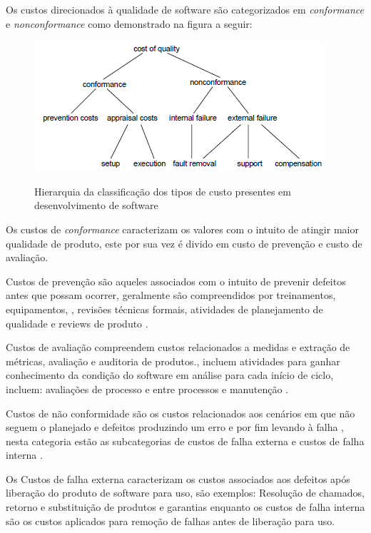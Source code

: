 \documentclass[
	12pt,				%
	oneside,			%
	a4paper,			%
	english,			%
	brazil				%
	]{abntex2ppgsi}
\begin{document}
Os custos direcionados à qualidade de software são categorizados em \textit{conformance} e \textit{nonconformance} \cite{ slaughter1998}\cite{pressman2009engenharia} como demonstrado na figura a seguir: 

\begin{figure}[H]%
	\centering
 	  \caption{Hierarquia da classificação dos tipos de custo presentes em desenvolvimento de software}
		\includegraphics{tipos-custo-arvore.png}
	\label{fig:tipos-custo-arvore}
\end{figure}

Os custos de \textit{conformance} caracterizam os valores com o intuito de atingir maior qualidade de produto, este por sua vez é divido em custo de prevenção e custo de avaliação. \cite{ wagner2005}

Custos de prevenção são aqueles associados com o intuito de prevenir defeitos antes que possam ocorrer, geralmente são compreendidos por treinamentos, equipamentos, , revisões técnicas formais, atividades de planejamento de qualidade e reviews de produto \cite{wagner2005} \cite{pressman2009engenharia}.

Custos de avaliação compreendem custos relacionados a medidas e extração de métricas, avaliação e auditoria de produtos.\cite{wagner2005}, incluem atividades para ganhar conhecimento da condição do software em análise para cada início de ciclo, incluem: avaliações de processo e entre processos e manutenção \cite{pressman2009engenharia}.

Custos de não conformidade são os custos relacionados aos cenários em que não seguem o planejado e defeitos produzindo um erro e por fim levando à falha \cite{wagner2005}, nesta categoria estão as subcategorias de custos de falha externa e custos de falha interna \cite{pressman2009engenharia}. 

Os Custos de falha externa caracterizam os custos associados aos defeitos após liberação do produto de software para uso, são exemplos: Resolução de chamados, retorno e substituição de produtos e garantias \cite{pressman2009engenharia} enquanto os custos de falha interna são os custos aplicados para remoção de falhas antes de liberação para uso.
\end{document}
